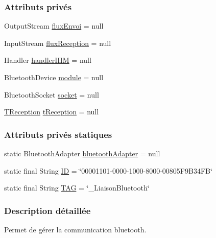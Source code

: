 \subsubsection*{Attributs privés}
\begin{DoxyCompactItemize}
\item 
Output\+Stream \hyperlink{classcom_1_1example_1_1area_1_1_liaison_bluetooth_ab6b076591203cae95fde933717019c5d}{flux\+Envoi} = null
\item 
Input\+Stream \hyperlink{classcom_1_1example_1_1area_1_1_liaison_bluetooth_a9a3a7d77bae06a972782b6e73471878d}{flux\+Reception} = null
\item 
Handler \hyperlink{classcom_1_1example_1_1area_1_1_liaison_bluetooth_ace2c20759fc96d3ae787f1f726fd2691}{handler\+I\+HM} = null
\item 
Bluetooth\+Device \hyperlink{classcom_1_1example_1_1area_1_1_liaison_bluetooth_a80068a7178f6c84eae7bab50cf0a784a}{module} = null
\item 
Bluetooth\+Socket \hyperlink{classcom_1_1example_1_1area_1_1_liaison_bluetooth_ab59b57f5e59d0236e49ecf68c053cb27}{socket} = null
\item 
\hyperlink{classcom_1_1example_1_1area_1_1_liaison_bluetooth_1_1_t_reception}{T\+Reception} \hyperlink{classcom_1_1example_1_1area_1_1_liaison_bluetooth_ae3ef79eced8ab42b066b624108860d48}{t\+Reception} = null
\end{DoxyCompactItemize}
\subsubsection*{Attributs privés statiques}
\begin{DoxyCompactItemize}
\item 
static Bluetooth\+Adapter \hyperlink{classcom_1_1example_1_1area_1_1_liaison_bluetooth_a7462ce946676c47ee83289c7bb436b64}{bluetooth\+Adapter} = null
\item 
static final String \hyperlink{classcom_1_1example_1_1area_1_1_liaison_bluetooth_a8f4d17b8ac09c7ba9213163de86fb669}{ID} = \char`\"{}00001101-\/0000-\/1000-\/8000-\/00805\+F9\+B34\+F\+B\char`\"{}
\item 
static final String \hyperlink{classcom_1_1example_1_1area_1_1_liaison_bluetooth_ac51aa4b63fae5c36734a061cc05d7fc9}{T\+AG} = \char`\"{}\+\_\+\+Liaison\+Bluetooth\char`\"{}
\end{DoxyCompactItemize}


\subsubsection{Description détaillée}
Permet de gérer la communication bluetooth. 

